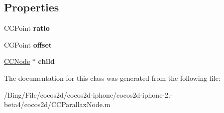 \subsection*{Properties}
\begin{DoxyCompactItemize}
\item 
\hypertarget{interface_c_g_point_object_a737afd40ec2d505d89087789709e1456}{C\-G\-Point {\bfseries ratio}}\label{interface_c_g_point_object_a737afd40ec2d505d89087789709e1456}

\item 
\hypertarget{interface_c_g_point_object_acd98799e665c22e7bcfa384f3aff2d7c}{C\-G\-Point {\bfseries offset}}\label{interface_c_g_point_object_acd98799e665c22e7bcfa384f3aff2d7c}

\item 
\hypertarget{interface_c_g_point_object_a26b0facf12d02df747717629189fd28c}{\hyperlink{class_c_c_node}{C\-C\-Node} $\ast$ {\bfseries child}}\label{interface_c_g_point_object_a26b0facf12d02df747717629189fd28c}

\end{DoxyCompactItemize}


The documentation for this class was generated from the following file\-:\begin{DoxyCompactItemize}
\item 
/\-Bing/\-File/cocos2d/cocos2d-\/iphone/cocos2d-\/iphone-\/2.-\/beta4/cocos2d/C\-C\-Parallax\-Node.\-m\end{DoxyCompactItemize}
